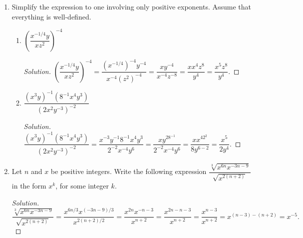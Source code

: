 \documentclass[12pt]{article}
\newenvironment{solution}{\begin{proof}[Solution]}{\end{proof}}
\begin{document}
\begin{enumerate}
		\item Simplify the expression to one involving only positive exponents. Assume that everything is well-defined.
		\begin{enumerate}
			\item $\left(\dfrac{x^{-1/4}y}{xz^2}\right)^{-4}$
			\begin{solution}
				$\left(\dfrac{x^{-1/4}y}{xz^2}\right)^{-4}=\dfrac{(x^{-1/4})^{-4}y^{-4}}{x^{-4}(z^2)^{-4}}=\dfrac{xy^{-4}}{x^{-4}z^{-8}}=\dfrac{xx^4z^8}{y^4}=\dfrac{x^5z^8}{y^4}.$
			\end{solution}
			\item $\dfrac{(x^3y)^{-1}(8^{-1}x^4y^3)}{(2x^2y^{-3})^{-2}}$
			\begin{solution}
				$\dfrac{(x^3y)^{-1}(8^{-1}x^4y^3)}{(2x^2y^{-3})^{-2}}=\dfrac{x^{-3}y^{-1}8^{-1}x^4y^3}{2^{-2}x^{-4}y^6}=\dfrac{xy^28^{-1}}{2^{-2}x^{-4}y^6}=\dfrac{xx^42^2}{8y^{6-2}}=\dfrac{x^5}{2y^4}.$
			\end{solution}
		\end{enumerate}
		\item Let $n$ and $x$ be positive integers. Write the following expression $\dfrac{\sqrt[3]{x^{6n}x^{-3n-9}}}{\sqrt{x^{2(n+2)}}}$ in the form $x^k$, for some integer $k$. 
		\begin{solution}
			$\dfrac{\sqrt[3]{x^{6n}x^{-3n-9}}}{\sqrt{x^{2(n+2)}}}=\dfrac{x^{6n/3}x^{(-3n-9)/3}}{x^{2(n+2)/2}}=\dfrac{x^{2n}x^{-n-3}}{x^{n+2}}=\dfrac{x^{2n-n-3}}{x^{n+2}}=\dfrac{x^{n-3}}{x^{n+2}}=x^{(n-3)-(n+2)}=x^{-5}.$
		\end{solution}
		

\end{enumerate}
\end{document}
